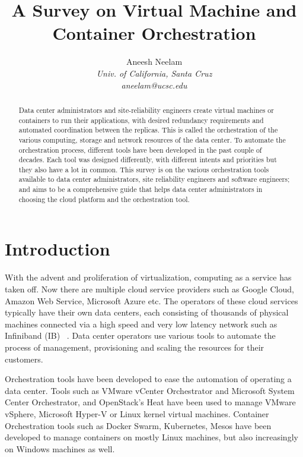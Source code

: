 \documentclass[10pt,twocolumn]{article}
\begin{document}
\title{A Survey on Virtual Machine and Container Orchestration}

\author{
Aneesh Neelam \\
\textit{Univ. of California, Santa Cruz} \\
\textit{aneelam@ucsc.edu}
}

\maketitle
\thispagestyle{empty}

\begin{abstract}

  Data center administrators and site-reliability engineers create virtual machines or containers to run their applications, with desired redundancy requirements and automated coordination between the replicas.
  This is called the orchestration of the various computing, storage and network resources of the data center.
  To automate the orchestration process, different tools have been developed in the past couple of decades.
  Each tool was designed differently, with different intents and priorities but they also have a lot in common.
  This survey is on the various orchestration tools available to data center administrators, site reliability engineers and software engineers;
  and aims to be a comprehensive guide that helps data center administrators in choosing the cloud platform and the orchestration tool.

\end{abstract}

\section{Introduction}

With the advent and proliferation of virtualization, computing as a service has taken off.
Now there are multiple cloud service providers such as Google Cloud, Amazon Web Service, Microsoft Azure etc.
The operators of these cloud services typically have their own data centers, each consisting of thousands of physical machines connected via a high speed and very low latency network such as Infiniband (IB) ~\cite{intro_infiniband}.
Data center operators use various tools to automate the process of management, provisioning and scaling the resources for their customers.

Orchestration tools have been developed to ease the automation of operating a data center.
Tools such as VMware vCenter Orchestrator and Microsoft System Center Orchestrator, and OpenStack's Heat have been used to manage VMware vSphere, Microsoft Hyper-V or Linux kernel virtual machines.
Container Orchestration tools such as Docker Swarm, Kubernetes, Mesos have been developed to manage containers on mostly Linux machines, but also increasingly on Windows machines as well.
\end{document}

